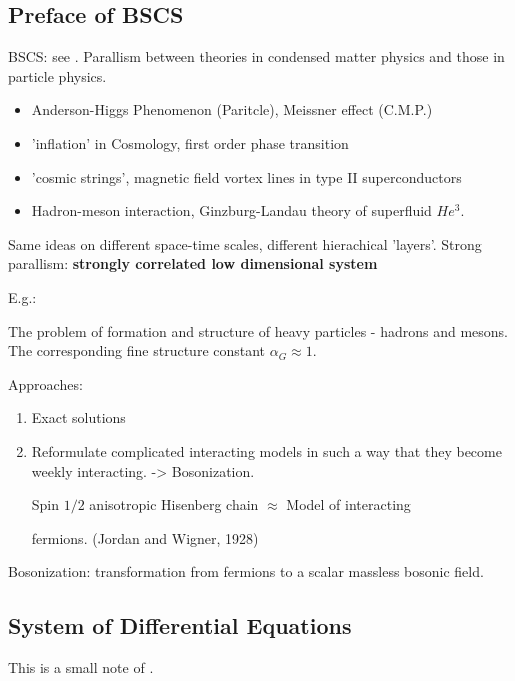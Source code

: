 \documentclass{article}
\numberwithin{equation}{subsection} %
\theoremstyle{definition}
\begin{document}
    \subsection{Preface of BSCS}
        \label{sec:Preface_of_Bosonization_and_Strongly 
        Correlated_Systems}
    BSCS: see \cite{BSCS}.
    Parallism between theories in condensed matter physics and those in
    particle physics.
    \begin{itemize}
            \item Anderson-Higgs Phenomenon (Paritcle), Meissner effect
                    (C.M.P.)
            \item 'inflation' in Cosmology, first order phase transition
            \item 'cosmic strings', magnetic field vortex lines in type
                    II superconductors
            \item Hadron-meson interaction, Ginzburg-Landau theory of
                    superfluid $He^3$.
    \end{itemize}
    Same ideas on different space-time scales, different hierachical
    'layers'.
    Strong parallism: \textbf{strongly correlated low dimensional system}

    E.g.:

    The problem of formation and structure of heavy particles - hadrons and mesons. The corresponding fine structure constant $\alpha_G\approx 1$.

    Approaches:
    \begin{enumerate}
            \item Exact solutions
            \item Reformulate complicated interacting models in such a way
                    that they become weekly interacting. -> Bosonization.
                    
                    Spin $1/2$ anisotropic Hisenberg chain $\approx$
                    Model of interacting

                    fermions.
                    (Jordan and Wigner, 1928)
    \end{enumerate}
    Bosonization: transformation from fermions to a scalar massless bosonic
    field.


    \subsection{System of Differential Equations}
    This is a small note of \cite{DETA}.
\end{document}
